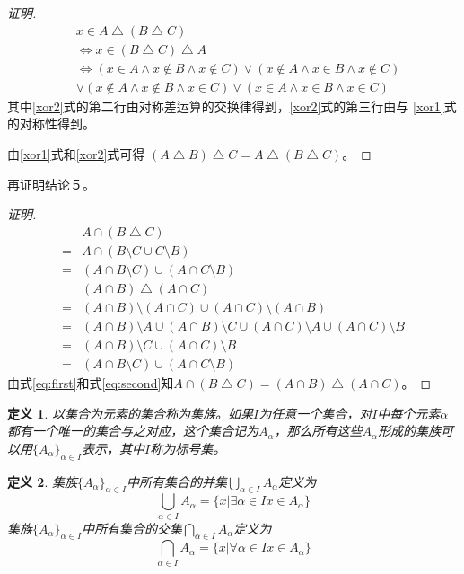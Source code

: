 \documentclass{book}[oneside]
\newtheorem{Def}{定义}[chapter]
\begin{document}
\begin{CJK*}{UTF8}{gbsn}
\begin{proof}[证明]
  \begin{equation}\label{xor2}
    \begin{split}
      &x \in A \bigtriangleup (B \bigtriangleup C)\\
      &\Leftrightarrow x \in (B \bigtriangleup C) \bigtriangleup A\\
      &\Leftrightarrow (x \in A \land x \notin B \land x \notin C) \lor (x \notin A \land x \in B \land x \notin C)\\
      &\lor (x \notin A \land x \notin B \land x \in C) \lor (x \in A \land x \in B \land x \in C)
    \end{split}
  \end{equation}
  其中\eqref{xor2}式的第二行由对称差运算的交换律得到，\eqref{xor2}式的第三行由与
   \eqref{xor1}式的对称性得到。

  由\eqref{xor1}式和\eqref{xor2}式可得
  $(A\bigtriangleup B)\bigtriangleup C = A\bigtriangleup (B\bigtriangleup C)$。
\end{proof}

再证明结论５。

\begin{proof}[证明]
   \begin{align}
    &A\cap (B\bigtriangleup C)\nonumber \\
    =&A\cap (B\setminus C \cup C\setminus B) \nonumber \\
    =&(A\cap B\setminus C) \cup (A \cap C\setminus B) \label{eq:first} \\      
    &(A\cap B)\bigtriangleup (A\cap C) \nonumber \\
    =&(A\cap B)\setminus (A\cap C) \cup (A\cap C)\setminus (A\cap B) \nonumber \\
    =&(A\cap B)\setminus A \cup (A\cap B)\setminus C \cup (A\cap C)\setminus A \cup (A\cap C)\setminus B \nonumber \\
    =&(A\cap B)\setminus C \cup (A\cap C)\setminus B \nonumber \\
    =&(A\cap B\setminus C) \cup (A \cap C\setminus B)\label{eq:second}      
   \end{align}
由式\eqref{eq:first}和式\eqref{eq:second}知$A\cap (B\bigtriangleup C)=(A\cap B)\bigtriangleup (A\cap C)$。
\end{proof}
  \begin{Def}  
    以集合为元素的集合称为集族。如果$I$为任意一个集合，对$I$中每个元素$\alpha$都有一个唯一的集合与之对应，这个集合记为$A_{\alpha}$，那么所有这些$A_{\alpha}$形成的集族可以用$\{A_{\alpha}\}_{\alpha \in I}$表示，其中$I$称为标号集。
  \end{Def}
  \begin{Def}
    集族$\{A_{\alpha}\}_{\alpha \in I}$中所有集合的并集$\bigcup_{\alpha \in I}A_{\alpha}$定义为
\[ \bigcup_{\alpha \in I}A_{\alpha} = \{x|\exists \alpha \in I  x \in A_{\alpha}\}\]
    集族$\{A_{\alpha}\}_{\alpha \in I}$中所有集合的交集$\bigcap_{\alpha \in I}A_{\alpha}$定义为
\[ \bigcap_{\alpha \in I}A_{\alpha} = \{x|\forall \alpha \in I x \in A_{\alpha}\}\]
  \end{Def}


\end{CJK*}
\end{document}
